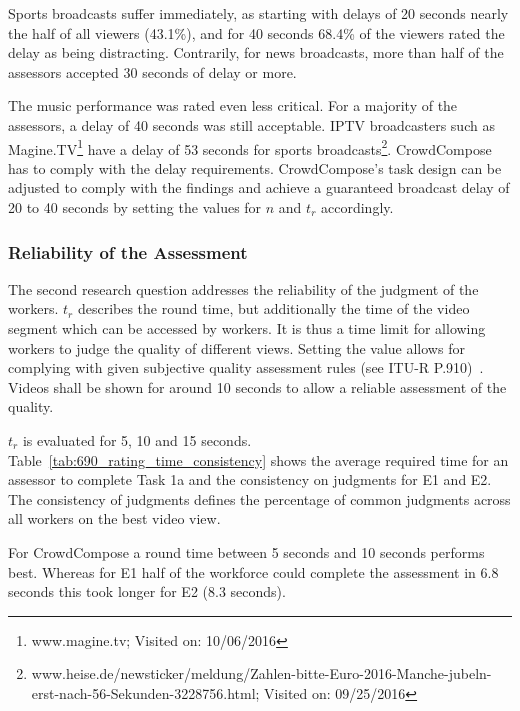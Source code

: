 Sports broadcasts suffer immediately, as starting with delays of 20 seconds nearly the half of all viewers (43.1\%), and for 40 seconds 68.4\% of the viewers rated the delay as being distracting. 
Contrarily, for news broadcasts, more than half of the assessors accepted 30 seconds of delay or more.

The music performance was rated even less critical. 
For a majority of the assessors, a delay of 40 seconds was still acceptable. 
\ac{IP}TV broadcasters such as Magine.TV\footnote{www.magine.tv; Visited on: 10/06/2016} have a delay of 53 seconds for sports broadcasts\footnote{www.heise.de/newsticker/meldung/Zahlen-bitte-Euro-2016-Manche-jubeln-erst-nach-56-Sekunden-3228756.html; Visited on: 09/25/2016}.
CrowdCompose has to comply with the delay requirements.
CrowdCompose's task design can be adjusted to comply with the findings and achieve a guaranteed broadcast delay of 20 to 40 seconds by setting the values for $n$ and $t_{r}$ accordingly. 
\subsubsection{Reliability of the Assessment}
The second research question addresses the reliability of the judgment of the workers.
$t_{r}$ describes the round time, but additionally the time of the video segment which can be accessed by workers.
It is thus a time limit for allowing workers to judge the quality of different views.
Setting the value allows for complying with given subjective quality assessment rules (see ITU-R P.910)~\cite{ITU-J2008}.
Videos shall be shown for around 10 seconds to allow a reliable assessment of the quality.
 
$t_r$ is evaluated for 5, 10 and 15 seconds.
Table~\ref{tab:690_rating_time_consistency} shows the average required time for an assessor to complete Task 1a and the consistency on judgments for E1 and E2. 
The consistency of judgments defines the percentage of common judgments across all workers on the best video view.

For CrowdCompose a round time between 5 seconds and 10 seconds performs best. 
Whereas for E1 half of the workforce could complete the assessment in 6.8 seconds this took longer for E2 (8.3 seconds). 

